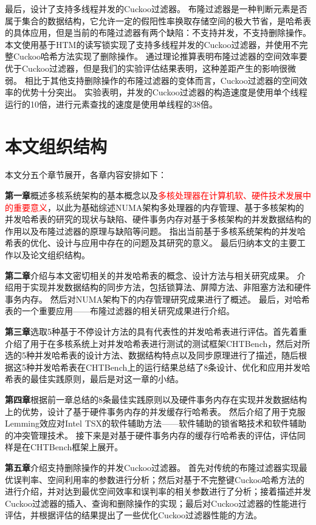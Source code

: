 最后，设计了支持多线程并发的Cuckoo过滤器。
布隆过滤器是一种判断元素是否属于集合的数据结构，它允许一定的假阳性率换取存储空间的极大节省，是哈希表的具体应用，但是当前的布隆过滤器有两个缺陷：不支持并发，不支持删除操作。
本文使用基于HTM的读写锁实现了支持多线程并发的Cuckoo过滤器，并使用不完整Cuckoo哈希方法实现了删除操作。
通过理论推算表明布隆过滤器的空间效率要优于Cuckoo过滤器，但是我们的实验评估结果表明，这种差距产生的影响很微弱。
相比于其他支持删除操作的布隆过滤器的变体而言，Cuckoo过滤器的空间效率的优势十分突出。
实验表明，并发的Cuckoo过滤器的构造速度是使用单个线程运行的10倍，进行元素查找的速度是使用单线程的38倍。


\section{本文组织结构}
本文分五个章节展开，各章内容安排如下：

\textbf{第一章}概述多核系统架构的基本概念以及\textcolor{red}{多核处理器在计算机软、硬件技术发展中的重要意义}，以此为基础综述NUMA架构多处理器的内存管理、基于多核架构的并发哈希表的研究的现状与缺陷、硬件事务内存对基于多核架构的并发数据结构的作用以及布隆过滤器的原理与缺陷等问题。
指出当前基于多核系统架构的并发哈希表的优化、设计与应用中存在的问题及其研究的意义。
最后归纳本文的主要工作以及论文组织结构。

\textbf{第二章}介绍与本文密切相关的并发哈希表的概念、设计方法与相关研究成果。
介绍用于实现并发数据结构的同步方法，包括锁算法、屏障方法、非阻塞方法和硬件事务内存。
然后对NUMA架构下的内存管理研究成果进行了概述。
最后，对哈希表的一个重要应用——布隆过滤器的相关研究成果进行介绍。

\textbf{第三章}选取5种基于不停设计方法的具有代表性的并发哈希表进行评估。首先着重介绍了用于在多核系统上对并发哈希表进行测试的测试框架CHTBench，然后对所选的5种并发哈希表的设计方法、数据结构特点以及同步原理进行了描述，随后根据这5种并发哈希表在CHTBench上的运行结果总结了8条设计、优化和应用并发哈希表的最佳实践原则，最后是对这一章的小结。

\textbf{第四章}根据前一章总结的8条最佳实践原则以及硬件事务内存在实现并发数据结构上的优势，设计了基于硬件事务内存的并发缓存行哈希表。
然后介绍了用于克服Lemming效应对Intel TSX的软件辅助方法——软件辅助的锁省略技术和软件辅助的冲突管理技术。
接下来是对基于硬件事务内存的缓存行哈希表的评估，评估同样是在CHTBench框架上展开。

\textbf{第五章}介绍支持删除操作的并发Cuckoo过滤器。
首先对传统的布隆过滤器实现最优误判率、空间利用率的参数进行分析；然后对基于不完整键Cuckoo哈希方法的进行介绍，并对达到最优空间效率和误判率的相关参数进行了分析；接着描述并发Cuckoo过滤器的插入、查询和删除操作的实现；最后对Cuckoo过滤器的性能进行评估，并根据评估的结果提出了一些优化Cuckoo过滤器性能的方法。

